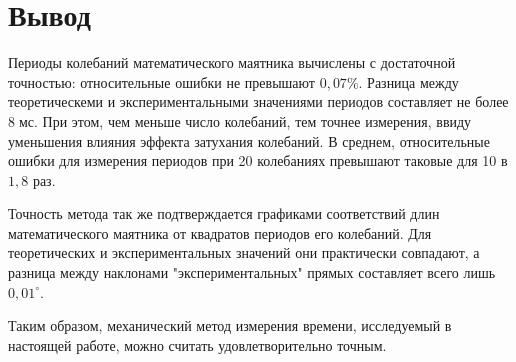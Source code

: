 \section{Вывод}

Периоды колебаний математического маятника вычислены с достаточной точностью: относительные ошибки не превышают $0{,}07\%$. Разница между теоретическеми и экспериментальными значениями периодов составляет не более $8\;\text{мс}$. При этом, чем меньше число колебаний, тем точнее измерения, ввиду уменьшения влияния эффекта затухания колебаний. В среднем, относительные ошибки для измерения периодов при 20 колебаниях превышают таковые для 10 в $1{,}8$ раз.

Точность метода так же подтверждается графиками соответствий длин математического маятника от квадратов периодов его колебаний. Для теоретических и экспериментальных значений они практически совпадают, а разница между наклонами "экспериментальных"{} прямых составляет всего лишь $0{,}01^\circ$.

Таким образом, механический метод измерения времени, исследуемый в настоящей работе, можно считать удовлетворительно точным.